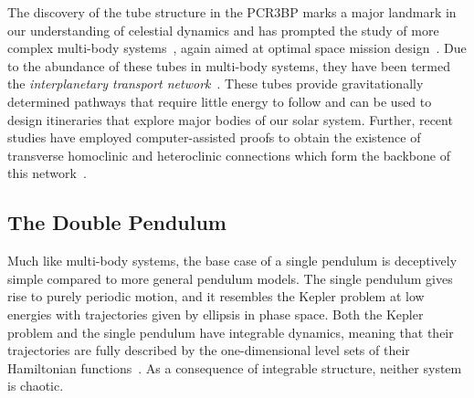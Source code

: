 \documentclass[11pt]{article}
\numberwithin{equation}{section}
\theoremstyle{plain}
\begin{document}
The discovery of the tube structure in the PCR3BP marks a major landmark in our understanding of celestial dynamics and has prompted the study of more complex multi-body systems~\cite{JJM2,JJM3,NBody1}, again aimed at optimal space mission design~\cite{NBody1,RossBook,Surfing,MarsdenAMS,JJM1,MasdemontReview}. Due to the abundance of these tubes in multi-body systems, they have been termed the {\em interplanetary transport network}~\cite{Interplanetary}. These tubes provide gravitationally determined pathways that require little energy to follow and can be used to design itineraries that explore major bodies of our solar system. Further, recent studies have employed computer-assisted proofs to obtain the existence of transverse homoclinic and heteroclinic connections which form the backbone of this network~\cite{CompAst1,CompAst2,CompAst3,CompAst4}.



\subsection{The Double Pendulum}

Much like multi-body systems, the base case of a single pendulum is deceptively simple compared to more general pendulum models. The single pendulum gives rise to purely periodic motion, and it resembles the Kepler problem at low energies with trajectories given by ellipsis in phase space.  Both the Kepler problem and the single pendulum have integrable dynamics, meaning that their trajectories are fully described by the one-dimensional level sets of their Hamiltonian functions~\cite{Integrable}. As a consequence of integrable structure, neither system is chaotic.  
\end{document}
